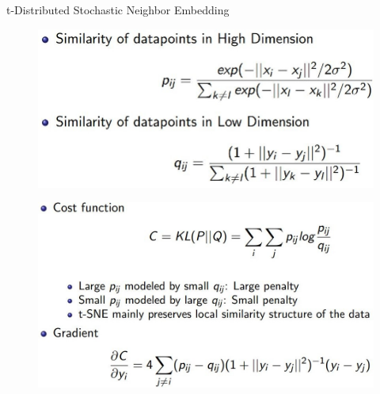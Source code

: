 \begin{frame}[allowframebreaks]{t-Distributed Stochastic Neighbor Embedding}
    \begin{figure}
        \centering
        \includegraphics[width=1\textwidth,keepaspectratio]{images/dul/dim-reduce/t-distributed-stochastic.jpg}
    \end{figure}

    \framebreak

    \begin{figure}
        \centering
        \includegraphics[width=1\textwidth,keepaspectratio]{images/dul/dim-reduce/t-distributed-stochastic-cost.jpg}
    \end{figure}
\end{frame}

